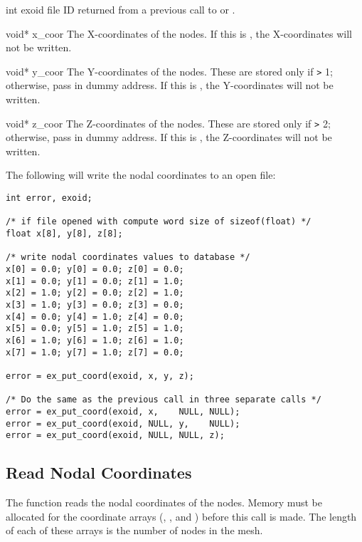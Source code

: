 \begin{parameters}
\item[{int exoid \R{}}]
\exo{} file ID returned from a previous call to 
or .

\item[{void* x_coor \R{}}]
The X-coordinates of the nodes. If this is , the
X-coordinates will not be written.

\item[{void* y_coor \R{}}]
The Y-coordinates of the nodes. These are stored only if 
\texttt{>} 1; otherwise, pass in dummy address. If this is , the
Y-coordinates will not be written.

\item[{void* z_coor \R{}}]
The Z-coordinates of the nodes. These are stored only if 
\texttt{>} 2; otherwise, pass in dummy address. If this is , the
Z-coordinates will not be written.
\end{parameters}

The following will write the nodal coordinates to an open
\exo{} file:

\begin{lstlisting}
int error, exoid;

/* if file opened with compute word size of sizeof(float) */
float x[8], y[8], z[8];

/* write nodal coordinates values to database */
x[0] = 0.0; y[0] = 0.0; z[0] = 0.0;
x[1] = 0.0; y[1] = 0.0; z[1] = 1.0;
x[2] = 1.0; y[2] = 0.0; z[2] = 1.0;
x[3] = 1.0; y[3] = 0.0; z[3] = 0.0;
x[4] = 0.0; y[4] = 1.0; z[4] = 0.0;
x[5] = 0.0; y[5] = 1.0; z[5] = 1.0;
x[6] = 1.0; y[6] = 1.0; z[6] = 1.0;
x[7] = 1.0; y[7] = 1.0; z[7] = 0.0;

error = ex_put_coord(exoid, x, y, z);

/* Do the same as the previous call in three separate calls */
error = ex_put_coord(exoid, x,    NULL, NULL);
error = ex_put_coord(exoid, NULL, y,    NULL);
error = ex_put_coord(exoid, NULL, NULL, z);
\end{lstlisting}


\subsection{Read Nodal Coordinates}




The function  reads the nodal coordinates of the
nodes. Memory must be allocated for the coordinate arrays (,
, and ) before this call is made. The length of each
of these arrays is the number of nodes in the mesh.

